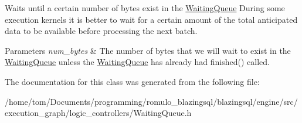 Waits until a certain number of bytes exist in the \hyperlink{classral_1_1cache_1_1WaitingQueue}{Waiting\+Queue} During some execution kernels it is better to wait for a certain amount of the total anticipated data to be available before processing the next batch. 
\begin{DoxyParams}{Parameters}
{\em num\+\_\+bytes} & The number of bytes that we will wait to exist in the \hyperlink{classral_1_1cache_1_1WaitingQueue}{Waiting\+Queue} unless the \hyperlink{classral_1_1cache_1_1WaitingQueue}{Waiting\+Queue} has already had finished() called. \\
\hline
\end{DoxyParams}


The documentation for this class was generated from the following file\+:\begin{DoxyCompactItemize}
\item 
/home/tom/\+Documents/programming/romulo\+\_\+blazingsql/blazingsql/engine/src/execution\+\_\+graph/logic\+\_\+controllers/Waiting\+Queue.\+h\end{DoxyCompactItemize}

